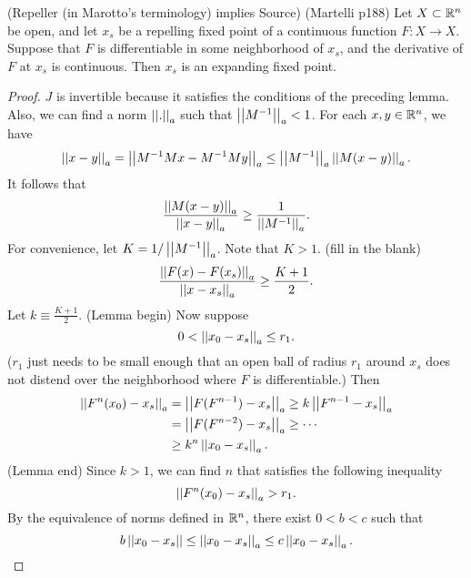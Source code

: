 \documentclass[12pt,draft,twoside]{book}
\begin{document}
\begin{proposition}
  (Repeller (in Marotto's terminology) implies Source)
  (Martelli p188)
  Let $X \subset \mathbb{R}^n$ be open, and let $x_s$ be a repelling fixed point
  of a continuous function $F: X \to X$. Suppose that $F$ is
  differentiable in some neighborhood of $x_s$, and the derivative of $F$ at $x_s$ is continuous.
  Then $x_s$ is an expanding fixed point.
\end{proposition}
\begin{proof}
  $J$ is invertible because it satisfies the conditions of the preceding lemma.
  Also, we can find a norm $\left|\left| . \right|\right|_a$ such that $\left|\left| M^{-1} \right|\right|_a < 1$.
  For each $x, y \in \mathbb{R}^n$, we have 
  \begin{equation*}
    \left|\left| x-y \right|\right|_a = \left|\left| M^{-1} M x - M^{-1} M y \right|\right|_a \leq \left|\left| M^{-1} \right|\right|_a \left|\left| M(x - y) \right|\right|_a.
  \end{equation*}
  It follows that 
  \begin{equation*}
    \frac{\left|\left| M(x-y) \right|\right|_a}{\left|\left| x-y \right|\right|_a} \geq \frac{1}{\left|\left| M^{-1} \right|\right|_a}.
  \end{equation*}
  For convenience, let $K = 1/\left|\left| M^{-1} \right|\right|_a$.
  Note that $K > 1$.
  (fill in the blank)
  \begin{equation*}
    \frac{\left|\left| F(x) - F(x_s) \right|\right|_a}{\left|\left| x - x_s \right|\right|_a} \geq \frac{K+1}{2}.
  \end{equation*}
  Let $k \equiv \frac{K+1}{2}$.
  (Lemma begin) Now suppose
  \begin{equation*}
    0 < \left|\left| x_0 - x_s \right|\right|_a \leq r_1.
  \end{equation*}
  ($r_1$ just needs to be small enough that an open ball
  of radius $r_1$ around $x_s$ does not distend over the
  neighborhood where $F$ is differentiable.) Then
  \begin{align*}
    \left|\left| F^n(x_0) - x_s \right|\right|_a &= \left|\left| F(F^{n-1}) - x_s \right|\right|_a \geq k \left|\left| F^{n-1} - x_s \right|\right|_a     \\
    &= \left|\left| F(F^{n-2}) - x_s \right|\right|_a \geq \cdots \\
    &\geq k^n \left|\left| x_0 - x_s \right|\right|_a.
  \end{align*}
  (Lemma end)
  Since $k > 1$, we can find $n$ that satisfies the following inequality
  \begin{equation*}
    \left|\left| F^n(x_0) - x_s \right|\right|_a > r_1.
  \end{equation*}
  By the equivalence of norms defined in $\mathbb{R}^n$, there exist $0 < b < c$ such that 
  \begin{equation*}
    b \norm{x_0 - x_s} \leq \norm{x_0 - x_s}_a \leq c \norm{x_0 - x_s}_a.

\end{equation*}
\end{proof}
\end{document}
